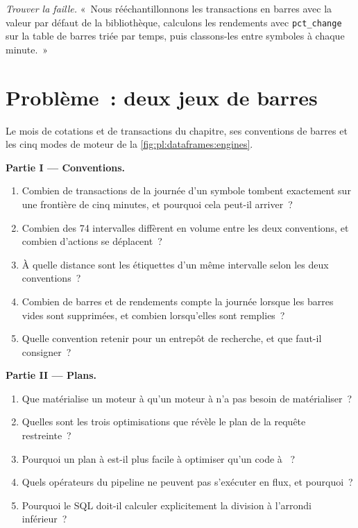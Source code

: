 \begin{exercise}[$\star\star\star$]\label{exo:pl:dataframes:8}
\emph{Trouver la faille.} «~Nous rééchantillonnons les transactions en barres avec la valeur par défaut de la bibliothèque, calculons les rendements avec \texttt{pct\_change} sur la table de barres
triée par temps, puis classons-les entre symboles à chaque minute.~»
\end{exercise}

\section{Problème~: deux jeux de barres}

\begin{problem}\label{pb:pl:dataframes:1}
Le mois de cotations et de transactions du chapitre, ses conventions de barres et les cinq modes de moteur de la \cref{fig:pl:dataframes:engines}.

\medskip\noindent\textbf{Partie I --- Conventions.}
\begin{enumerate}
\item Combien de transactions de la journée d'un symbole tombent exactement sur une frontière de cinq minutes, et pourquoi cela peut-il arriver~?
\item Combien des 74 intervalles diffèrent en volume entre les deux conventions, et combien d'actions se déplacent~?
\item À quelle distance sont les étiquettes d'un même intervalle selon les deux conventions~?
\item Combien de barres et de rendements compte la journée lorsque les barres vides sont supprimées, et combien lorsqu'elles sont remplies~?
\item Quelle convention retenir pour un entrepôt de recherche, et que faut-il consigner~?
\end{enumerate}

\medskip\noindent\textbf{Partie II --- Plans.}
\begin{enumerate}[resume]
\item Que matérialise un moteur à  qu'un moteur à  n'a pas besoin de matérialiser~?
\item Quelles sont les trois optimisations que révèle le plan de la requête restreinte~?
\item Pourquoi un plan à  est-il plus facile à optimiser qu'un code à ~?
\item Quels opérateurs du pipeline ne peuvent pas s'exécuter en flux, et pourquoi~?
\item Pourquoi le SQL doit-il calculer explicitement la division à l'arrondi inférieur~?
\end{enumerate}


\end{problem}
